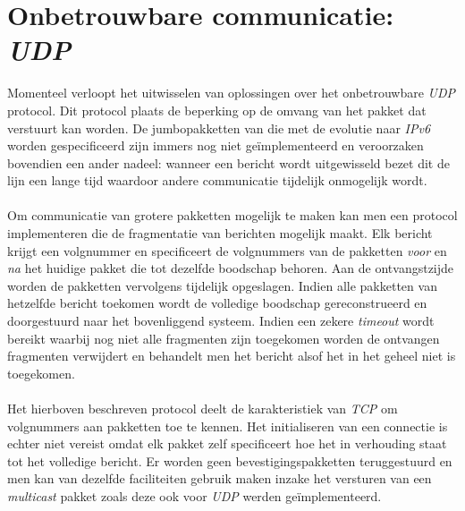 \section{Onbetrouwbare communicatie: \emph{UDP}}

Momenteel verloopt het uitwisselen van oplossingen over het onbetrouwbare \emph{UDP} protocol. Dit protocol plaats de beperking op de omvang van het pakket dat verstuurt kan worden. De jumbopakketten van die met de evolutie naar \emph{IPv6} worden gespecificeerd zijn immers nog niet ge\"implementeerd en veroorzaken bovendien een ander nadeel: wanneer een bericht wordt uitgewisseld bezet dit de lijn een lange tijd waardoor andere communicatie tijdelijk onmogelijk wordt.

\paragraph{}
Om communicatie van grotere pakketten mogelijk te maken kan men een protocol implementeren die de fragmentatie van berichten mogelijk maakt. Elk bericht krijgt een volgnummer en specificeert de volgnummers van de pakketten \emph{voor} en \emph{na} het huidige pakket die tot dezelfde boodschap behoren. Aan de ontvangstzijde worden de pakketten vervolgens tijdelijk opgeslagen. Indien alle pakketten van hetzelfde bericht toekomen wordt de volledige boodschap gereconstrueerd en doorgestuurd naar het bovenliggend systeem. Indien een zekere \emph{timeout} wordt bereikt waarbij nog niet alle fragmenten zijn toegekomen worden de ontvangen fragmenten verwijdert en behandelt men het bericht alsof het in het geheel niet is toegekomen.

\paragraph{}
Het hierboven beschreven protocol deelt de karakteristiek van \emph{TCP} om volgnummers aan pakketten toe te kennen. Het initialiseren van een connectie is echter niet vereist omdat elk pakket zelf specificeert hoe het in verhouding staat tot het volledige bericht. Er worden geen bevestigingspakketten teruggestuurd en men kan van dezelfde faciliteiten gebruik maken inzake het versturen van een \emph{multicast} pakket zoals deze ook voor \emph{UDP} werden ge\"implementeerd.